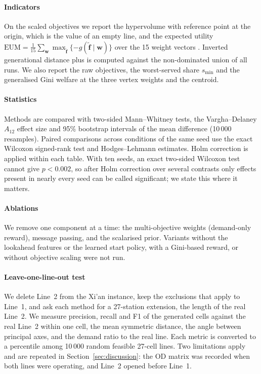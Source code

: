 \paragraph{Indicators} On the scaled objectives we report the hypervolume with reference point at the origin, which is the value of an empty line, and the expected utility $\mathrm{EUM}=\frac{1}{15}\sum_{\mathbf w}\max_{\tilde{\mathbf f}}\{-g(\tilde{\mathbf f}\mid\mathbf w)\}$ over the 15 weight vectors \citep{hayes2022}. Inverted generational distance plus \citep{ishibuchi2015} is computed against the non-dominated union of all runs. We also report the raw objectives, the worst-served share $s_{\min}$ and the generalised Gini welfare at the three vertex weights and the centroid.

\paragraph{Statistics} Methods are compared with two-sided Mann--Whitney tests, the Vargha--Delaney $A_{12}$ effect size and 95\% bootstrap intervals of the mean difference (10\,000 resamples). Paired comparisons across conditions of the same seed use the exact Wilcoxon signed-rank test and Hodges--Lehmann estimates. Holm correction is applied within each table. With ten seeds, an exact two-sided Wilcoxon test cannot give $p<0.002$, so after Holm correction over several contrasts only effects present in nearly every seed can be called significant; we state this where it matters.

\paragraph{Ablations} We remove one component at a time: the multi-objective weights (demand-only reward), message passing, and the scalarised prior. Variants without the lookahead features or the learned start policy, with a Gini-based reward, or without objective scaling were not run.

\paragraph{Leave-one-line-out test} We delete Line~2 from the Xi'an instance, keep the exclusions that apply to Line~1, and ask each method for a 27-station extension, the length of the real Line~2. We measure precision, recall and F1 of the generated cells against the real Line~2 within one cell, the mean symmetric distance, the angle between principal axes, and the demand ratio to the real line. Each metric is converted to a percentile among 10\,000 random feasible 27-cell lines. Two limitations apply and are repeated in Section~\ref{sec:discussion}: the OD matrix was recorded when both lines were operating, and Line~2 opened before Line~1.

